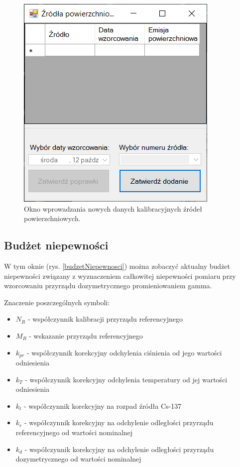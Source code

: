 \begin{figure}[htb]
	\centering
	\includegraphics{obrazki/Ustawienia/wzorcowanie_zrodel_powierzchniowych_dodawanie.png}
	\caption{Okno wprowadzania nowych danych kalibracyjnych źródeł powierzchniowych.}
	\label{wzorcowanieZrodelPowierzchniowychDod}
\end{figure}

\subsection{Budżet niepewności}
\label{budzet}

W tym oknie (rys. \ref{budzetNiepewnosci}) można zobaczyć aktualny budżet niepewności związany z wyznaczeniem całkowitej niepewności pomiaru przy wzorcowaniu przyrządu dozymetrycznego promieniowaniem gamma.

Znaczenie poszczególnych symboli:
\begin{itemize}
	\item \textbf{$N_{R}$} - współczynnik kalibracji przyrządu referencyjnego
	\item \textbf{$M_{R}$} - wskazanie przyrządu referencyjnego
	\item \textbf{$k_{pr}$} - współczynnik korekcyjny odchylenia ciśnienia od jego wartości odniesienia
	\item \textbf{$k_{T}$} - współczynnik korekcyjny odchylenia temperatury od jej wartości odniesienia
	\item \textbf{$k_{t}$} - współczynnik korekcyjny na rozpad źródła Cs-137
	\item \textbf{$k_{r}$} - współczynnik korekcyjny na odchylenie odległości przyrządu referencyjnego od wartości nominalnej
	\item \textbf{$k_{d}$} - współczynnik korekcyjny na odchylenie odległości przyrządu dozymetrycznego od wartości nominalnej
\end{itemize}

